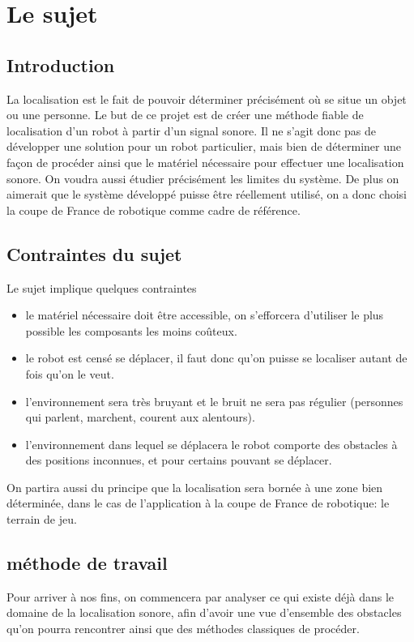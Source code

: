 \documentclass[12pt,a4paper]{report}
\begin{document}
\tableofcontents


\chapter{Le sujet}

\section{Introduction}
La localisation est le fait de pouvoir déterminer précisément où se situe un objet ou une personne. Le but de ce projet est de créer une méthode fiable de localisation d'un robot à partir d'un signal sonore. Il ne s'agit donc pas de développer une solution pour un robot particulier, mais bien de déterminer une façon de procéder ainsi que le matériel nécessaire pour effectuer une localisation sonore. On voudra aussi étudier précisément les limites du système. De plus on aimerait que le système développé puisse être réellement utilisé, on a donc choisi la coupe de France de robotique comme cadre de référence.

\section{Contraintes du sujet}
Le sujet implique quelques contraintes
\begin{itemize}
\item le matériel nécessaire doit être accessible, on s'efforcera d'utiliser le plus possible les composants les moins coûteux.
\item le robot est censé se déplacer, il faut donc qu'on puisse se localiser autant de fois qu'on le veut.
\item l'environnement sera très bruyant et le bruit ne sera pas régulier (personnes qui parlent, marchent, courent aux alentours).
\item l'environnement dans lequel se déplacera le robot comporte des obstacles à des positions inconnues, et pour certains pouvant se déplacer.
\end{itemize}
On partira aussi du principe que la localisation sera bornée à une zone bien déterminée, dans le cas de l'application à la coupe de France de robotique: le terrain de jeu. 

\section{méthode de travail}
Pour arriver à nos fins, on commencera par analyser ce qui existe déjà dans le domaine de la localisation sonore, afin d'avoir une vue d'ensemble des obstacles qu'on pourra rencontrer ainsi que des méthodes classiques de procéder.
\end{document}
